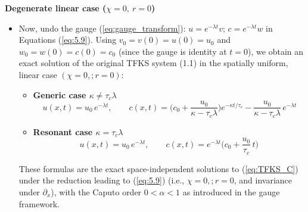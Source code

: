 \documentclass{article}
\begin{document}
\begin{description}
\begin{itemize}
\end{itemize}
 \item[(III)] \textbf{Degenerate linear case ($\chi=0,\ r=0$)}
\begin{itemize}
\item[\textbf{III.A)}]
\par 
Now, undo the gauge (\ref{eq:gauge_transform}): $u=e^{-\lambda t}v;\, c=e^{-\lambda t}w$ in Equations (\ref{eq:5.9}). Using $v_0=v(0)=u(0)=u_0$ and $w_0=w(0)=c(0)=c_0$ (since the gauge is identity at $t=0$), we obtain an exact solution of the original TFKS system (1.1) in the spatially uniform, linear case $(\chi=0,;r=0)$:
\begin{itemize}
\item[$\bullet$] \textbf{Generic case $\kappa\neq \tau_c\lambda$}
\begin{equation}\label{eq:6_IIIA1}
\,u(x,t)=u_0\,e^{-\lambda t},\qquad c(x,t)=\Big(c_0+\frac{u_0}{\kappa-\tau_c\lambda}\Big)e^{-\kappa t/\tau_c}-\frac{u_0}{\kappa-\tau_c\lambda}\,e^{-\lambda t}
\end{equation}
\item[$\bullet$] \textbf{Resonant case $\kappa=\tau_c\lambda$}
\begin{equation}\label{eq:6_IIIA2}
u(x,t)=u_0\,e^{-\lambda t},\qquad c(x,t)=e^{-\lambda t}\Big(c_0+\frac{u_0}{\tau_c}\,t\Big)
\end{equation}
\end{itemize}
These formulas are the exact space-independent solutions to (\ref{eq:TFKS_C}) under the reduction leading to (\ref{eq:5.9}) (i.e., $\chi=0,; r=0$, and invariance under $\partial_x$), with the Caputo order $0<\alpha< 1$ as introduced in the gauge framework. 


\end{itemize}
\end{description}
\end{document}
